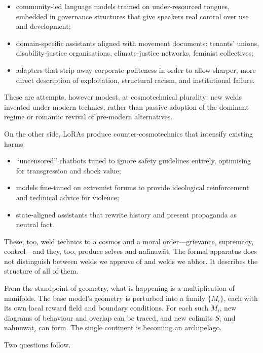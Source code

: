 \begin{itemize}
  \item community-led language models trained on under-resourced tongues, embedded in governance structures that give speakers real control over use and development;
  \item domain-specific assistants aligned with movement documents: tenants' unions, disability-justice organisations, climate-justice networks, feminist collectives;
  \item adapters that strip away corporate politeness in order to allow sharper, more direct description of exploitation, structural racism, and institutional failure.
\end{itemize}

These are attempts, however modest, at cosmotechnical plurality: new welds invented under modern technics, rather than passive adoption of the dominant regime or romantic revival of pre-modern alternatives.

On the other side, LoRAs produce counter-cosmotechnics that intensify existing harms:

\begin{itemize}
  \item ``uncensored'' chatbots tuned to ignore safety guidelines entirely, optimising for transgression and shock value;
  \item models fine-tuned on extremist forums to provide ideological reinforcement and technical advice for violence;
  \item state-aligned assistants that rewrite history and present propaganda as neutral fact.
\end{itemize}

These, too, weld technics to a cosmos and a moral order---grievance, supremacy, control---and they, too, produce selves and na\={h}nuw\={a}t. The formal apparatus does not distinguish between welds we approve of and welds we abhor. It describes the structure of all of them.

From the standpoint of geometry, what is happening is a multiplication of manifolds. The base model's geometry is perturbed into a family $\{M_i\}$, each with its own local reward field and boundary conditions. For each such $M_i$, new diagrams of behaviour and overlap can be traced, and new colimits $S_i$ and na\={h}nuw\={a}t$_i$ can form. The single continent is becoming an archipelago.

Two questions follow.

